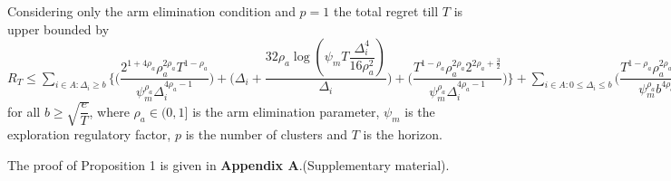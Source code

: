 


\begin{proposition}
\label{Result:Prop:1}
Considering only the arm elimination condition and $p=1$ the total regret till $T$ is upper bounded by $R_{T}\leq \sum\limits_{i\in A:\Delta_{i}\geq b}\bigg\lbrace\bigg(\dfrac{2^{1+4\rho_{a}}\rho_{a}^{2\rho_{a}}T^{1-\rho_{a}}}{\psi_{m}^{\rho_{a}}\Delta_{i}^{4\rho_{a}-1}}\bigg) + \bigg(\Delta_{i}+\dfrac{32\rho_{a}\log{(\psi_{m}T\dfrac{\Delta_{i}^{4}}{16\rho_{a}^{2}})}}{\Delta_{i}}\bigg)  +  \bigg(\dfrac{T^{1-\rho_{a}}\rho_{a}^{2\rho_{a}}2^{2\rho_{a}+\frac{3}{2}}}{\psi_{m}^{\rho_{a}}\Delta_{i}^{4\rho_{a} -1}} \bigg) \bigg \rbrace+\sum\limits_{i\in A:0\leq\Delta_{i}\leq b}\bigg(\dfrac{T^{1-\rho_{a}}\rho_{a}^{2\rho_{a}}2^{2\rho_{a}+\frac{3}{2}}}{\psi_{m}^{\rho_{a}}b^{4\rho_{a} -1}} \bigg) + max_{i:\Delta_{i}\leq b}\Delta_{i}T$ for all $b\geq\sqrt{\dfrac{e}{T}}$, where $\rho_{a}\in (0,1]$ is the arm elimination parameter, $\psi_{m}$ is the exploration regulatory factor, $p$ is the number of clusters and $T$ is the horizon.
\end{proposition}


	The proof of Proposition 1 is given in \textbf{Appendix A}.(Supplementary material).

